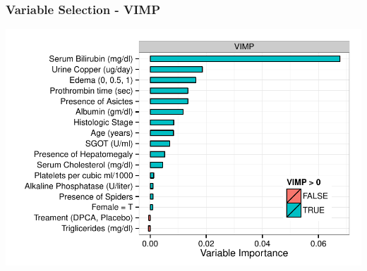 \documentclass[xcolor=svgnames]{beamer}\usepackage[]{graphicx}\usepackage[]{color}
\newenvironment{knitrout}{}{} %
\begin{document}
\begin{frame}
\frametitle{Variable Selection - VIMP}
\begin{knitrout}\footnotesize
{}\color{fgcolor}

{\centering \includegraphics[width=.9\linewidth]{figures/rf-pbc-vimp-1} 

}



\end{knitrout}
\end{frame}
%
%
\end{document}
